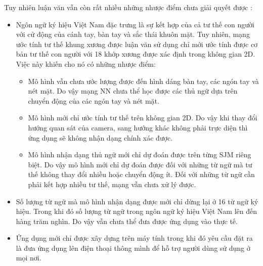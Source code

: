 Tuy nhiên luận văn vẫn còn rất nhiều những nhược điểm chưa giải quyết được :
	\begin{itemize}
	\item Ngôn ngữ ký hiệu Việt Nam đặc trưng là sự kết hợp của cả tư thế con người với cử động của cánh tay, bàn tay và sắc thái khuôn mặt. Tuy nhiên, mạng ước tính tư thế khung xương được luận văn sử dụng chỉ mới ước tính được cơ bản tư thế con người với 18 khớp xương được xác định trong không gian 2D. Việc này khiến cho nó có những nhược điểm: 
\begin{itemize}
	\item Mô hình vẫn chưa ước lượng được đến hình dáng bàn tay, các ngón tay và nét mặt. Do vậy mạng NN chưa thể học được các thủ ngữ dựa trên chuyển động của các ngón tay và nét mặt.
	\item Mô hình mới chỉ ước tính tư thế trên không gian 2D. Do vậy khi thay đổi hướng quan sát của camera, sang hướng khác không phải trực diện thì ứng dụng sẽ không nhận dạng chính xác được.
	\item Mô hình nhận dạng thủ ngữ mới chỉ dự đoán được trên từng SJM riêng biệt. Do vậy mô hình mới chỉ dự đoán được đối với những từ ngữ mà tư thế không thay đổi nhiều hoặc chuyển động ít. Đối với những từ ngữ cần phải kết hợp nhiều tư thế, mạng vẫn chưa xử lý được.
	\end{itemize}
\item Số lượng từ ngữ mà mô hình nhận dạng được mới chỉ dừng lại ở 16 từ ngữ ký hiệu. Trong khi đó số lượng từ ngữ trong ngôn ngữ ký hiệu Việt Nam lên đến hàng trăm nghìn. Do vậy vẫn chưa thể đưa được ứng dụng vào thực tế.

\item Ứng dụng mới chỉ được xây dựng trên máy tính trong khi đó yêu cầu đặt ra là đưa ứng dụng lên điện thoại thông mình để hỗ trợ người dùng sử dụng ở mọi nơi.
\end{itemize}
